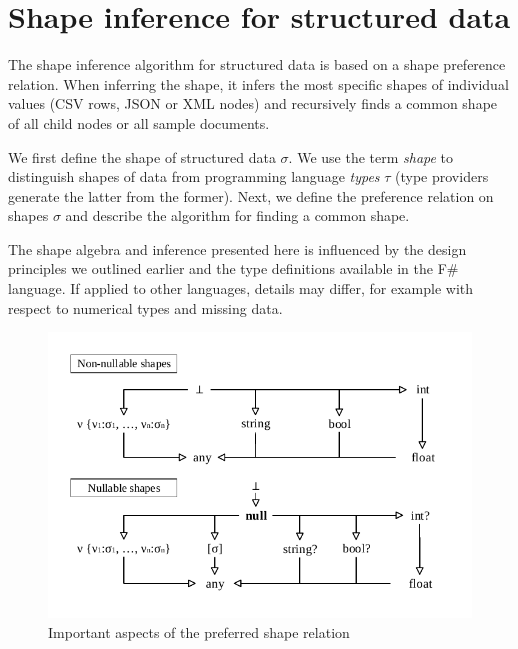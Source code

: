 \documentclass[10pt,preprint,clearpagebib]{sigplanconf}
\begin{document}
\section{Shape inference for structured data}
\label{sec:inference}

The shape inference algorithm for structured data is based on a shape preference relation. When 
inferring the shape, it infers the most specific shapes of individual values (CSV rows, JSON or XML 
nodes) and recursively finds a common shape of all child nodes or all sample documents.

We first define the shape of structured data $\sigma$. We use the term \emph{shape} to distinguish 
shapes of data from programming language \emph{types} $\tau$ (type providers generate the latter from the former). 
Next, we define the preference relation on shapes $\sigma$ and describe the algorithm 
for finding a common shape. 

The shape algebra and inference presented here is influenced by the design principles
we outlined earlier and the type definitions available in the F\# language.
If applied to other languages, details may differ, for example
with respect to numerical types and missing data.


\begin{figure}
\begin{center}
\includegraphics[scale=0.80,trim=5mm 5mm 5mm 5mm,clip]{images/hierarchy.pdf} %
\end{center}
\vspace{-0.5em}
\caption{Important aspects of the preferred shape relation}
\label{fig:subtyping-diagram}
\vspace{-0.5em}
\end{figure}
\end{document}
